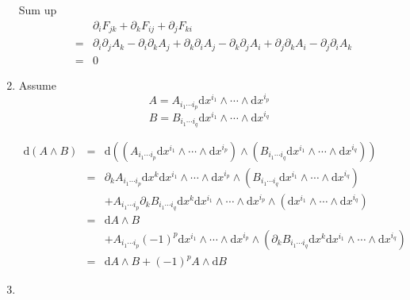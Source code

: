 \documentclass[12pt,a4paper]{article}
\begin{document}
\begin{enumerate}
Sum up
\begin{eqnarray*}
	&&\partial_i F_{jk} + \partial_k F_{ij} +\partial_j F_{ki} \\
	&=& \partial_i\partial_j A_k - \partial_i\partial_k A_j + \partial_k\partial_i A_j - \partial_k\partial_j A_i +  \partial_j\partial_k A_i - \partial_j\partial_i A_k \\
	&=& 0
\end{eqnarray*}








\item

Assume
\begin{equation}
	A = A_{i_1\cdots i_p} \mathrm dx^{i_1}\wedge\cdots \wedge \mathrm dx^{i_p}
\end{equation}
\begin{equation}
	B = B_{i_1\cdots i_q} \mathrm dx^{i_1}\wedge \cdots\wedge \mathrm dx^{i_q}
\end{equation}

\begin{eqnarray*}
	\mathrm d(A\wedge B) &=& \mathrm d((A_{i_1\cdots i_p} \mathrm dx^{i_1}\wedge\cdots \wedge \mathrm dx^{i_p}) \wedge (B_{i_1\cdots i_q}  \mathrm dx^{i_1}\wedge \cdots\wedge \mathrm dx^{i_q})) \\
	&=& \partial_k A_{i_1\cdots i_p} \mathrm dx^k   \mathrm dx^{i_1}\wedge\cdots \wedge \mathrm dx^{i_p}  \wedge (B_{i_1\cdots i_q}  \mathrm dx^{i_1}\wedge \cdots\wedge \mathrm dx^{i_q})  \\
	&&+ A_{i_1\cdots i_p} \partial_k B_{i_1\cdots i_q} \mathrm dx^k   \mathrm dx^{i_1}\wedge\cdots \wedge \mathrm dx^{i_p}  \wedge (\mathrm dx^{i_1}\wedge \cdots\wedge \mathrm dx^{i_q})  \\
	&=& \mathrm d A  \wedge B  \\
	&& + A_{i_1\cdots i_p} (-1)^p   \mathrm dx^{i_1}\wedge\cdots \wedge \mathrm dx^{i_p}  \wedge (\partial_k B_{i_1\cdots i_q} \mathrm dx^k  \mathrm dx^{i_1}\wedge \cdots\wedge \mathrm dx^{i_q})   \\
	&=&  \mathrm d A  \wedge B   + (-1)^p A\wedge \mathrm d B
\end{eqnarray*}



\item


\end{enumerate}
\end{document}

